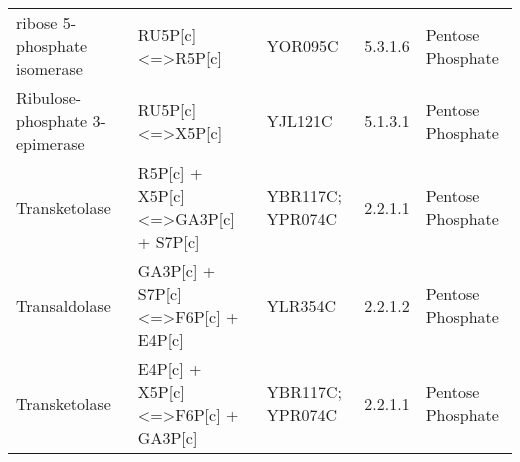 {\begin{landscape}
\begin{longtable}{p{.25\linewidth} | p{.40\linewidth} | p{.19\linewidth} | p{.05\linewidth} | p{.10\linewidth}}
ribose 5-phosphate isomerase                                                              & RU5P{[}c{]} \textless{}=\textgreater R5P{[}c{]}                                                                                                 & YOR095C                                                                                                                                                          & 5.3.1.6            & Pentose Phosphate                                                           \\
Ribulose-phosphate 3-epimerase                                                            & RU5P{[}c{]} \textless{}=\textgreater X5P{[}c{]}                                                                                                 & YJL121C                                                                                                                                                          & 5.1.3.1            & Pentose Phosphate                                                           \\
Transketolase                                                                             & R5P{[}c{]} + X5P{[}c{]} \textless{}=\textgreater GA3P{[}c{]} + S7P{[}c{]}                                                                       & YBR117C; YPR074C                                                                                                                                                 & 2.2.1.1            & Pentose Phosphate                                                           \\
Transaldolase                                                                             & GA3P{[}c{]} + S7P{[}c{]} \textless{}=\textgreater F6P{[}c{]} + E4P{[}c{]}                                                                       & YLR354C                                                                                                                                                          & 2.2.1.2            & Pentose Phosphate                                                           \\
Transketolase                                                                             & E4P{[}c{]} + X5P{[}c{]} \textless{}=\textgreater F6P{[}c{]} + GA3P{[}c{]}                                                                       & YBR117C; YPR074C                                                                                                                                                 & 2.2.1.1            & Pentose Phosphate                                                           \\

\end{longtable}
\end{landscape}}
